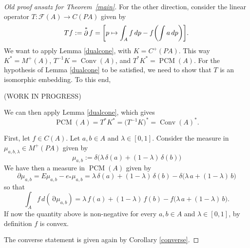 \documentclass[a4paper,12pt]{scrartcl}
\numberwithin{equation}{section}
\theoremstyle{plain}
\theoremstyle{definition}
\DeclareMathOperator{\1}{\mathbbm{1}}
\DeclareMathOperator{\2}{\mathbbm{2}}
\DeclareMathOperator{\D}{\partial}
\let\originalleft\left
\let\originalright\right
\renewcommand{\left}{\mathopen{}\mathclose\bgroup\originalleft}
\renewcommand{\right}{\aftergroup\egroup\originalright}
\begin{document}
\begin{proof}[Old proof ansatz for Theorem~\ref{main}]
  For the other direction, consider the linear operator $T:\mathcal{F}(A)\to C(PA)$ given by
  \begin{equation}
   Tf := \D^*f = \left[ p \mapsto \int_A f\,dp - f\left( \int a \, dp \right) \right].
  \end{equation}
  We want to apply Lemma \ref{dualcone}, with $K=C^+(PA)$. This way $K^*=M^+(A)$, $T^{-1}K = \operatorname{Conv}(A)$, and $T^*K^*=\operatorname{PCM}(A)$. 
  For the hypothesis of Lemma \ref{dualcone} to be satisfied, we need to show that $T$ is an isomorphic embedding. To this end,
  
  (WORK IN PROGRESS)
  
  We can then apply Lemma \ref{dualcone}, which gives
  \begin{equation}
   \operatorname{PCM}(A) = T^*K^* = \big(T^{-1}K\big)^* = \operatorname{Conv}(A)^*.
  \end{equation}

  First, let $f\in C(A)$. Let $a,b\in A$ and $\lambda\in [0,1]$. Consider the measure in $\mu_{a,b,\lambda} \in M^+(PA)$ given by
  \begin{equation*}
   \mu_{a,b} := \delta\big( \lambda\, \delta(a) + (1-\lambda) \, \delta(b)  \big)
  \end{equation*}
  We have then a measure in $\operatorname{PCM}(A)$ given by
  \begin{equation*}
   \partial\mu_{a,b} = E\mu_{a,b} - e_*\mu_{a,b} =  \lambda\, \delta(a) + (1-\lambda) \, \delta(b)  - \delta \big( \lambda\, a + (1-\lambda) \, b  \big)
  \end{equation*}
  so that
  \begin{equation*}
   \int_A f \, d(\D\mu_{a,b}) =  \lambda\, f(a) + (1-\lambda) \, f(b)  - f \big( \lambda\, a + (1-\lambda) \, b  \big) .
  \end{equation*}
  If now the quantity above is non-negative for every $a,b\in A$ and $\lambda\in [0,1]$, by definition $f$ is convex. 
  
  The converse statement is given again by Corollary \ref{converse}.  
\end{proof}


\end{document}

